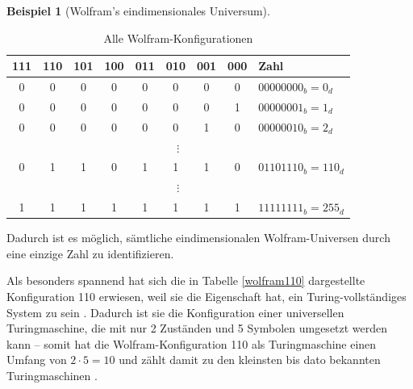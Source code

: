 \documentclass[11pt]{report} %
\theoremstyle{definition}
\newtheorem*{beisp}{Beispiel}
\begin{document}
\begin{beisp}[Wolfram's eindimensionales Universum]
\begin{table}[here]
\begin{center}
\begin{tabular}{|c|c|c|c|c|c|c|c||l|}
\hline
111 & 110 & 101 &100 &011 &010 &001 &000 & Zahl \\\hline\hline
 0 & 0 & 0 & 0& 0 & 0 & 0 & 0 & $00000000_b = 0_d$ \\\hline
 0 & 0 & 0 & 0& 0 & 0 & 0 & 1 & $00000001_b = 1_d$ \\\hline
 0 & 0 & 0 & 0& 0 & 0 & 1 & 0 & $00000010_b = 2_d$ \\\hline
\multicolumn{9}{|c|}{$\vdots$} \\\hline
 0 & 1 & 1 & 0& 1 & 1 & 1 & 0 & $01101110_b = 110_d$ \\\hline
\multicolumn{9}{|c|}{$\vdots$} \\\hline
 1 & 1 & 1 & 1& 1 & 1 & 1 & 1 & $11111111_b = 255_d$ \\\hline
\end{tabular}
\end{center}
\caption{Alle Wolfram-Konfigurationen}
\label{wolframalle}
\end{table}

Dadurch ist es möglich, sämtliche eindimensionalen Wolfram-Universen durch eine einzige Zahl zu identifizieren.

Als besonders spannend hat sich die in Tabelle \ref{wolfram110} dargestellte Konfiguration 110 erwiesen, weil sie die Eigenschaft hat, ein Turing-vollständiges System zu sein \cite{betz2003, wolfram2002}. Dadurch ist sie die Konfiguration einer universellen Turingmaschine, die mit nur 2 Zuständen und 5 Symbolen umgesetzt werden kann -- somit hat die Wolfram-Konfiguration 110 als Turingmaschine einen Umfang von $2\cdot 5 = 10$ und zählt damit zu den kleinsten bis dato bekannten Turingmaschinen \cite{betz2003}.

\end{beisp}
\end{document}
